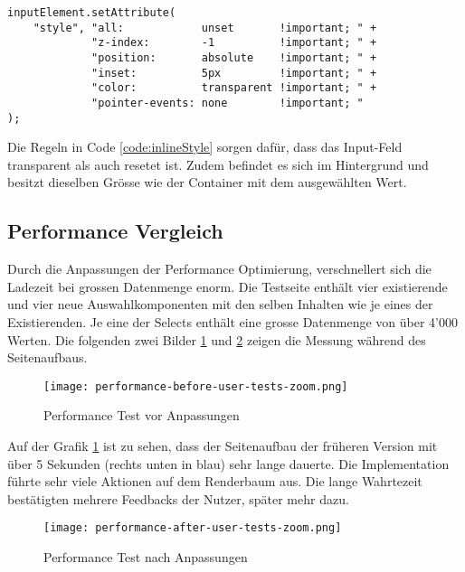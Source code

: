 \begin{lstlisting}[style = htmlcssjs, caption = Inline-Style für Input-Feld, label = code:inlineStyle]
inputElement.setAttribute(
    "style", "all:            unset       !important; " +
             "z-index:        -1          !important; " +
             "position:       absolute    !important; " +
             "inset:          5px         !important; " +
             "color:          transparent !important; " +
             "pointer-events: none        !important; "
);
\end{lstlisting}

Die Regeln in Code \ref{code:inlineStyle} sorgen dafür, dass das Input-Feld transparent als auch resetet ist. 
Zudem befindet es sich im Hintergrund und besitzt dieselben Grösse wie der Container mit dem ausgewählten Wert. 


\subsection{Performance Vergleich}
\label{sec:performanceCompare}

Durch die Anpassungen der Performance Optimierung, verschnellert sich die Ladezeit bei grossen Datenmenge enorm. 
Die Testseite enthält vier existierende und vier neue Auswahlkomponenten mit den selben Inhalten wie je eines der Existierenden. 
Je eine der Selects enthält eine grosse Datenmenge von über 4'000 Werten. 
Die folgenden zwei Bilder \ref{img:performanceTestBefore} und \ref{img:performanceTestAfter} zeigen die Messung während des Seitenaufbaus. 

\begin{figure}[!htb]
    \centering
    \texttt{[image: performance-before-user-tests-zoom.png]}
    \caption{\centering Performance Test vor Anpassungen}
    \label{img:performanceTestBefore}
\end{figure}

Auf der Grafik \ref{img:performanceTestBefore} ist zu sehen, dass der Seitenaufbau der früheren Version mit über 5 Sekunden (rechts unten in blau) sehr lange dauerte. 
Die Implementation führte sehr viele Aktionen auf dem Renderbaum aus. 
Die lange Wahrtezeit bestätigten mehrere Feedbacks der Nutzer, später mehr dazu. 

\begin{figure}[!htb]
    \centering
    \texttt{[image: performance-after-user-tests-zoom.png]}
    \caption{\centering Performance Test nach Anpassungen}
    \label{img:performanceTestAfter}
\end{figure}


